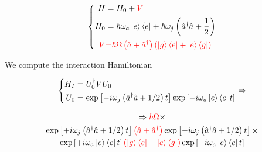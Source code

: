   \begin{equation}
    \left\lbrace 
      \begin{aligned}
        H & = H_0+{\color{red}{V}}\\
        H_0 & = \hbar\omega_a\ket{e}\bra{e} + \hbar\omega_j\left(\hat{a}^\dagger\hat{a}+\frac{1}{2}\right)\\
        \textcolor{red}{V}              &              {\color{red}{=}}              \textcolor{red}{{\hbar
            \Omega}\left(\hat{a}+\hat{a}^\dagger\right)\left(\ket{g}\bra{e}+\ket{e}\bra{g}\right)}
      \end{aligned}\right.
    \label{eqn:lightAtomHamiltonians}
  \end{equation}
  
  \noindent We compute the interaction Hamiltonian
  
  \begin{equation}
    \left\lbrace
      \begin{aligned}
        H_I & = U_0^\dagger V U_0 \\
        U_0                                         &                                        =
        \exp\left[-i\omega_j\left(\hat{a}^\dagger\hat{a}+{1}/{2}\right)t\right]\exp\left[-i\omega_a\ket{e}\bra{e}t\right]
      \end{aligned}\right. \Rightarrow
  \end{equation}
  
  \begin{multline}
    \Rightarrow \textcolor{red}{\hbar \Omega} \times \\
    \exp\left[+i\omega_j\left(\hat{a}^\dagger\hat{a}+{1}/{2}\right)t\right]\textcolor{red}{\left(\hat{a}+\hat{a}^\dagger\right)}\exp\left[-i\omega_j\left(\hat{a}^\dagger\hat{a}+{1}/{2}\right)t\right] \times\\
    \exp\left[+i\omega_a\ket{e}\bra{e}t\right]\textcolor{red}{\left(\ket{g}\bra{e}+\ket{e}\bra{g}\right)}\exp\left[-i\omega_a\ket{e}\bra{e}t\right]
  \end{multline}
  

